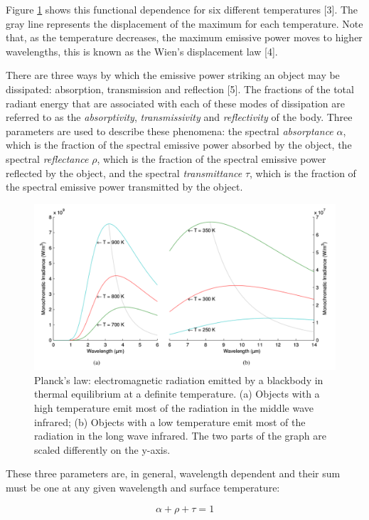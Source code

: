 		Figure \ref{fig3} shows this functional dependence for six different temperatures [3]. The gray line represents the displacement of the maximum for each temperature. Note that, as the temperature decreases, the maximum emissive power moves to higher wavelengths, this is known as the Wien's displacement law [4]. 
		
		There are three ways by which the emissive power striking an object may be dissipated: absorption, transmission and reflection [5]. The fractions of the total radiant energy that are associated with each of these modes of dissipation are referred to as the \textit{absorptivity}, \textit{transmissivity} and \textit{reflectivity} of the body. Three parameters are used to describe these phenomena: the spectral \textit{absorptance} $\alpha$, which is the fraction of the spectral emissive power absorbed by the object, the spectral \textit{reflectance} $\rho$, which is the fraction of the spectral emissive power reflected by the object, and the spectral \textit{transmittance} $\tau$, which is the fraction of the spectral emissive power transmitted by the object.
		
		\begin{figure}[ht!]
			\centering
			\captionsetup{justification=centering,margin=2cm}
			\includegraphics[scale=0.45]{Figures/Chapter01/PlankFunction.pdf}
			\caption{\label{fig3} Planck's law: electromagnetic radiation emitted by a blackbody in thermal equilibrium at a definite  temperature. (a) Objects with a high temperature emit most of the radiation in the middle wave infrared; (b) Objects with a low temperature emit most of the radiation in the long wave infrared. The two parts of the graph are scaled differently on the y-axis.}
		\end{figure}		
		
		These three parameters are, in general, wavelength dependent and their sum must be one at any given wavelength and surface temperature:
		
		\begin{equation}
			\label{eq2}
			\alpha + \rho + \tau = 1
		\end{equation}	
		
			
